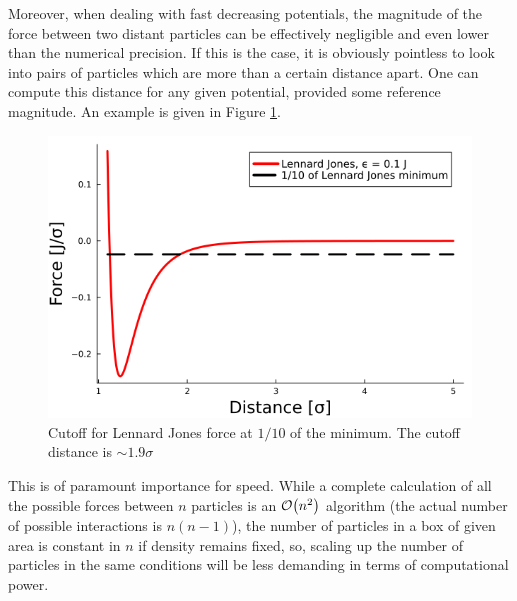 \documentclass[../../master_thesis_np.tex]{subfiles}
\begin{document}
	Moreover, when dealing with fast decreasing potentials, the magnitude of the force between two distant particles can be effectively negligible and even lower than the numerical precision.
	If this is the case, it is obviously pointless to look into pairs of particles which are more than a certain distance apart. 
	One can compute this distance for any given potential, provided some reference magnitude. 
	An example is given in Figure \ref{fig:force_zero}.
	\begin{figure}[htp]
		\centering
		\includegraphics[width=\textwidth]{lj_zero.png}
		\caption{Cutoff for Lennard Jones force at $1/10$ of the minimum. The cutoff distance is $\sim 1.9\sigma$}
		\label{fig:force_zero}
	\end{figure}
	This is of paramount importance for speed. 
	While a complete calculation of all the possible forces between $n$ particles is an $\order{n^2}$ algorithm (the actual number of possible interactions is $n(n-1)$), the number of particles in a box of given area is constant in $n$ if density remains fixed, so, scaling up the number of particles in the same conditions will be less demanding in terms of computational power.
	
\end{document}
